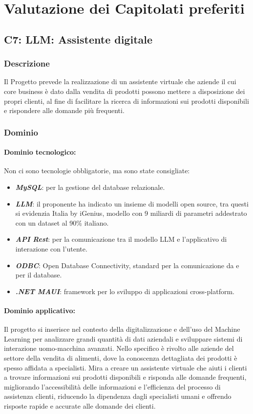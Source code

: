 \section{Valutazione dei Capitolati preferiti}


\subsection{C7: LLM: Assistente digitale}

\subsubsection{Descrizione}
Il Progetto prevede la realizzazione di un assistente virtuale 
che aziende il cui core business è dato dalla vendita di prodotti
possono mettere a disposizione dei propri clienti, 
al fine di facilitare la ricerca di informazioni sui prodotti disponibili 
e rispondere alle domande più frequenti.
\subsubsection{Dominio}
\paragraph{Dominio tecnologico:}
Non ci sono tecnologie obbligatorie, ma sono state consigliate:
\begin{itemize}
    \item \textit{\textbf{MySQL}}: per la gestione del database relazionale.
    \item \textit{\textbf{LLM}}: il proponente ha indicato un insieme di modelli open source, tra questi si evidenzia Italia by iGenius, modello con 9 miliardi di parametri addestrato con un dataset al 90\% italiano.
    \item \textit{\textbf{API Rest}}: per la comunicazione tra il modello LLM e l'applicativo di interazione con l'utente.
    \item \textit{\textbf{ODBC}}: Open Database Connectivity, standard per la comunicazione da e per il database.
    \item \textit{\textbf{.NET MAUI}}: framework per lo sviluppo di applicazioni cross-platform.
\end{itemize}
\paragraph{Dominio applicativo:}
Il progetto si inserisce nel contesto della digitalizzazione e dell’uso del Machine Learning 
per analizzare grandi quantità di dati aziendali e sviluppare sistemi di interazione uomo-macchina avanzati. 
Nello specifico è rivolto alle aziende del settore della vendita di alimenti, 
dove la conoscenza dettagliata dei prodotti è spesso affidata a specialisti. 
Mira a creare un assistente virtuale che aiuti i clienti a trovare informazioni sui prodotti disponibili 
e risponda alle domande frequenti, migliorando l’accessibilità delle informazioni 
e l’efficienza del processo di assistenza clienti, riducendo la dipendenza dagli specialisti umani 
e offrendo risposte rapide e accurate alle domande dei clienti.
